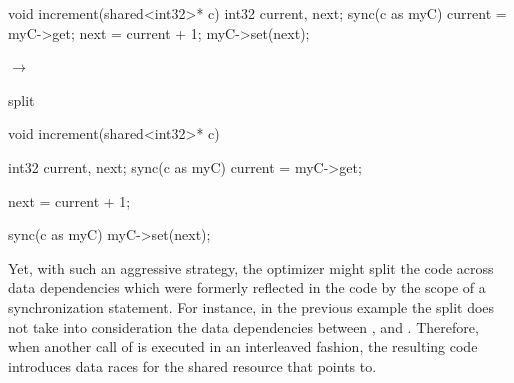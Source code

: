 \vspace{4mm}
\begin{minipage}{1\textwidth}
\begin{minipage}{0.37\textwidth}
\begin{ccode}{}
void increment(shared<int32>* c) {
  int32 current, next;
  sync(c as myC) {
    current = myC->get;
    next = current + 1;
    myC->set(next);
  }
}
\end{ccode}
\end{minipage}
\begin{minipage}{0.2\textwidth}
\begin{center}
$\longrightarrow$

split
\end{center}
\end{minipage}
\begin{minipage}{0.42\textwidth}
\begin{ccode}{}
void increment(shared<int32>* c) {
  int32 current, next;
  sync(c as myC) { current = myC->get; }
  
  next = current + 1;

  sync(c as myC) { myC->set(next); }
}
\end{ccode}
\end{minipage}
\end{minipage}
\vspace{2mm}

Yet, with such an aggressive strategy, the optimizer might split the code across data dependencies which were formerly reflected in the code by the scope of a synchronization statement. For instance, in the previous example the split does not take into consideration the data dependencies between ,  and . Therefore, when another call of  is executed in an interleaved fashion, the resulting code introduces data races for the shared resource that  points to.

